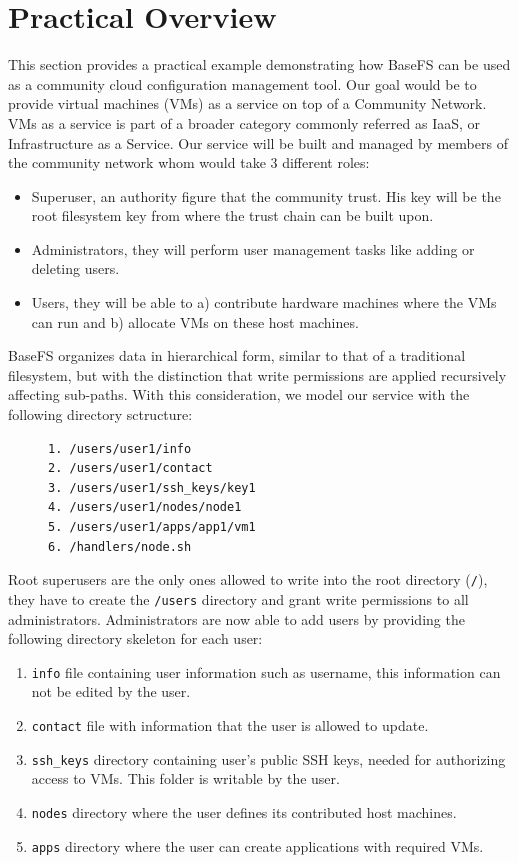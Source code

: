 \documentclass{sig-alternate}
\begin{document}
\section{Practical Overview} \label{example}

This section provides a practical example demonstrating how BaseFS can be used as a community cloud configuration management tool. Our goal would be to provide virtual machines (VMs) as a service on top of a Community Network. VMs as a service is part of a broader category commonly referred as IaaS, or Infrastructure as a Service. Our service will be built and managed by members of the community network whom would take 3 different roles:

\begin{itemize}
 \item Superuser, an authority figure that the community trust. His key will be the root filesystem key from where the trust chain can be built upon.
 \item Administrators, they will perform user management tasks like adding or deleting users.
 \item Users, they will be able to a) contribute hardware machines where the VMs can run and b) allocate VMs on these host machines.
\end{itemize}

BaseFS organizes data in hierarchical form, similar to that of a traditional filesystem, but with the distinction that write permissions are applied recursively affecting sub-paths. With this consideration, we model our service with the following directory sctructure:

\begin{figure}[H]
\centering
\begin{BVerbatim}
1. /users/user1/info
2. /users/user1/contact
3. /users/user1/ssh_keys/key1
4. /users/user1/nodes/node1
5. /users/user1/apps/app1/vm1
6. /handlers/node.sh
\end{BVerbatim}
\end{figure}


Root superusers are the only ones allowed to write into the root directory (\texttt{/}), they have to create the \texttt{/users} directory and grant write permissions to all administrators. Administrators are now able to add users by providing the following directory skeleton for each user:

\begin{enumerate}
 \item \texttt{info} file containing user information such as username, this information can not be edited by the user.
 \item \texttt{contact} file with information that the user is allowed to update.
 \item \texttt{ssh\_keys} directory containing user's public SSH keys, needed for authorizing access to VMs. This folder is writable by the user.
 \item \texttt{nodes} directory where the user defines its contributed host machines.
 \item \texttt{apps} directory where the user can create applications with required VMs.
\end{enumerate}
\end{document}
